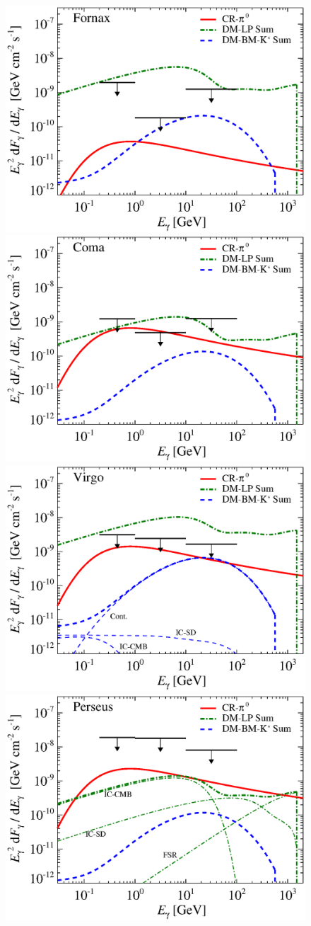 \documentclass[10pt,aps,pra,reprint,amsmath,amsfonts,amssymb,showpacs]{revtex4-1}
\begin{document}
\begin{figure}
\begin{minipage}{2.0\columnwidth}
 \includegraphics[width=0.49\columnwidth]{figures/flux.cluster.Fornax.v9.0.1deg.1.6T.SubMass.SF300.IR2.noMW.woGal.eps}
\includegraphics[width=0.49\columnwidth]{figures/flux.cluster.Coma.v9.0.1deg.1.6T.SubMass.SF300.IR2.noMW.woGal.eps}
\includegraphics[width=0.49\columnwidth]{figures/flux.cluster.Virgo.v9.0.1deg.1.6T.SubMass.SF300.IR2.noMW.woGal.eps}
\includegraphics[width=0.49\columnwidth]{figures/flux.cluster.Perseus.v9.0.1deg.1.6T.SubMass.SF300.IR2.noMW.woGal.eps}


\end{minipage}
\end{figure}
\end{document}
